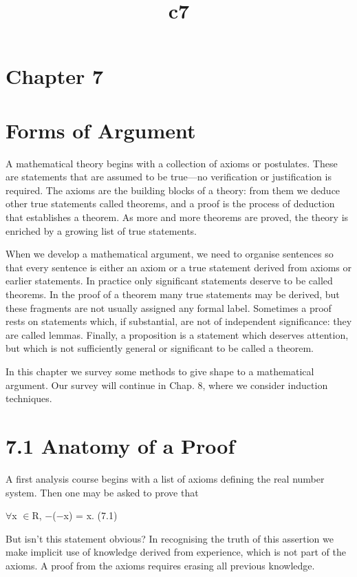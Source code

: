 \documentclass[11pt]{article}
\title{c7}
\date{}
\theoremstyle{plain}
\theoremstyle{definition}
\begin{document}
\maketitle

\section{Chapter 7}

\section{Forms of Argument}

A mathematical theory begins with a collection of axioms or postulates. These are statements that are assumed to be true---no verification or justification is required. The axioms are the building blocks of a theory: from them we deduce other true statements called theorems, and a proof is the process of deduction that establishes a theorem. As more and more theorems are proved, the theory is enriched by a growing list of true statements.

When we develop a mathematical argument, we need to organise sentences so that every sentence is either an axiom or a true statement derived from axioms or earlier statements. In practice only significant statements deserve to be called theorems. In the proof of a theorem many true statements may be derived, but these fragments are not usually assigned any formal label. Sometimes a proof rests on statements which, if substantial, are not of independent significance: they are called lemmas. Finally, a proposition is a statement which deserves attention, but which is not sufficiently general or significant to be called a theorem.

In this chapter we survey some methods to give shape to a mathematical argument. Our survey will continue in Chap. 8, where we consider induction techniques.

\section{7.1 Anatomy of a Proof}

A first analysis course begins with a list of axioms defining the real number system. Then one may be asked to prove that

$\forall$x $\in$R, $-$($-$x) = x. (7.1)

But isn't this statement obvious? In recognising the truth of this assertion we make implicit use of knowledge derived from experience, which is not part of the axioms. A proof from the axioms requires erasing all previous knowledge.
\end{document}
